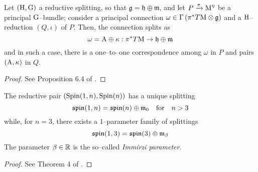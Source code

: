 \begin{teo}\label{koba-nomi}
    Let $(\text{\normalfont H},\text{\normalfont G})$ a reductive splitting, so that $\mathfrak{g}=\mathfrak{h}\oplus\mathfrak{m}$, and let $P\xrightarrow{\pi}\text{\normalfont M}^\eta$ be a principal $\text{\normalfont G}$--bundle; consider a principal connection $\omega\in\Gamma\left(\pi^*T\text{\normalfont M}\otimes\mathfrak{g}\right)$ and a $\text{\normalfont H}$--reduction $(Q,\iota)$ of $P$. Then, the connection splits as
    $$\omega=\text{\normalfont A}\oplus \kappa:\pi^*T\text{\normalfont M}\to\mathfrak{h}\oplus\mathfrak{m}$$
    and in such a case, there is a one--to--one correspondence among $\omega$ in $P$ and pairs $(\text{\normalfont A},\kappa)$ in $Q$.
\end{teo}
\begin{proof}
    See Proposition 6.4 of \cite{kobayashi1}.
\end{proof}

\begin{teo}\label{orizzonte}
    The reductive pair $\left(\text{\normalfont Spin}(1,n),\text{\normalfont Spin}(n)\right)$ has a unique splitting
    $$\mathfrak{spin}(1,n)=\mathfrak{spin}(n)\oplus\mathfrak{m}_0 \quad\text{for}\quad n>3$$
    while, for $n=3$, there exists a $1$--parameter family of splittings
    $$\mathfrak{spin}(1,3)=\mathfrak{spin}(3)\oplus\mathfrak{m}_\beta$$
    The parameter $\beta\in\mathbb{R}$ is the so--called \emph{Immirzi parameter}.
\end{teo}
\begin{proof}
    See Theorem 4 of \cite{OF1}.
\end{proof}

